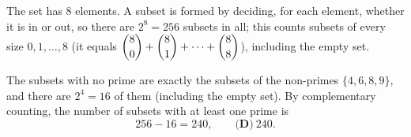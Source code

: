 The set has $8$ elements. A subset is formed by deciding, for each element, whether it is in or out, so there are $2^8=256$ subsets in all; this counts subsets of every size $0,1,\dots,8$ (it equals $\dbinom80+\dbinom81+\dots+\dbinom88$), including the empty set.

The subsets with no prime are exactly the subsets of the non-primes $\{4,6,8,9\}$, and there are $2^4=16$ of them (including the empty set). By complementary counting, the number of subsets with at least one prime is
\[
256-16=240,\qquad\textbf{(D)}\ \boxed{240}.
\]
